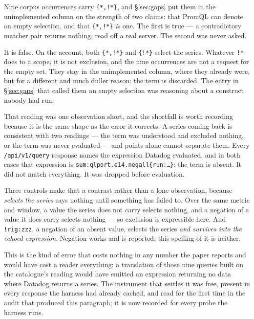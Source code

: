 \begin{remark}\label{rem:negated-all}
Nine corpus occurrences carry \texttt{\{*,!*\}}, and \S\ref{sec:gaps} put them in the
unimplemented column on the strength of two claims: that PromQL can denote an empty
selection, and that \texttt{\{*,!*\}} \emph{is} one. The first is true --- a
contradictory matcher pair returns nothing, read off a real server. The second was never
asked.

It is false. On the account, both \texttt{\{*,!*\}} and \texttt{\{!*\}} select the
series. Whatever \texttt{!*} does to a scope, it is not exclusion, and the nine
occurrences are not a request for the empty set. They stay in the unimplemented column,
where they already were, but for a different and much duller reason: the term is
discarded. The entry in \S\ref{sec:gaps} that called them an empty selection was
reasoning about a construct nobody had run.

That reading was one observation short, and the shortfall is worth recording because it
is the same shape as the error it corrects. A series coming back is consistent with two
readings --- the term was understood and excluded nothing, or the term was never
evaluated --- and points alone cannot separate them. Every \texttt{/api/v1/query}
response names the expression Datadog evaluated, and in both cases that expression is
\texttt{sum:qlport.e14.negall\{run:\ldots\}}: the term is absent. It did not match
everything. It was dropped before evaluation.

Three controls make that a contrast rather than a lone observation, because
\emph{selects the series} says nothing until something has failed to. Over the same
metric and window, a value the series does not carry selects nothing, and a negation of
a value it does carry selects nothing --- so exclusion is expressible here. And
\texttt{!rig:zzz}, a negation of an absent value, selects the series \emph{and survives
into the echoed expression}. Negation works and is reported; this spelling of it is
neither.

This is the kind of error that costs nothing in any number the paper reports and would
have cost a reader everything: a translation of those nine queries built on the
catalogue's reading would have emitted an expression returning no data where Datadog
returns a series. The instrument that settles it was free, present in every response the
harness had already cached, and read for the first time in the audit that produced this
paragraph; it is now recorded for every probe the harness runs.
\end{remark}

